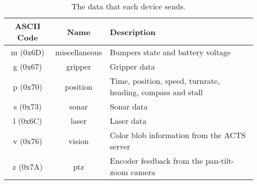 \documentclass[11pt]{article}
\begin{document}
\begin{table}
\begin{center}
\begin{tabularx}{\columnwidth}{|c|c|X|}
\hline
ASCII Code & Name & Description \\
\hline
m (0x6D) & miscellaneous & Bumpers state and battery voltage\\
\hline
g (0x67) & gripper & Gripper data \\
\hline
p (0x70) & position & Time, position, speed, turnrate, heading, compass and stall \\
\hline
s (0x73) & sonar & Sonar data \\
\hline
l (0x6C) & laser & Laser data \\
\hline
v (0x76) & vision & Color blob information from the ACTS server \\
\hline
z (0x7A) & ptz & Encoder feedback from the pan-tilt-zoom camera \\
\hline
\end{tabularx}
\end{center}
\caption{The data that each device sends.}
\label{data}
\end{table}
\end{document}
